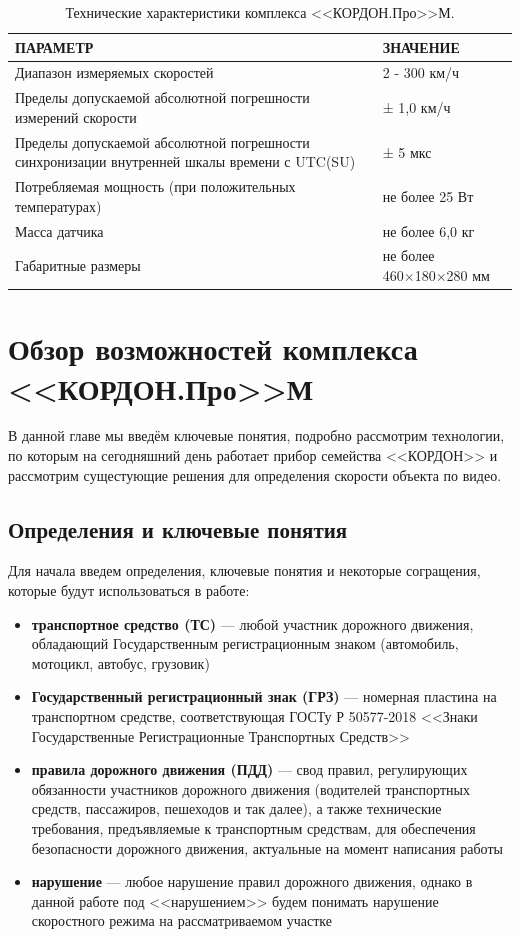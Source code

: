 \documentclass[specification,annotation,times]{itmo-student-thesis}
\begin{document}
\begin{table}[!ht]
	\caption{Технические характеристики комплекса <<КОРДОН.Про>>М.}\label{tb1:cordon-tech}
	\centering
	\begin{tabular}{|p{}|p{}|}\hline
		\textbf{ПАРАМЕТР} &	\textbf{ЗНАЧЕНИЕ} \\\hline\hline
		Диапазон измеряемых скоростей	& 2 - 300 км/ч\\\hline
		Пределы допускаемой абсолютной погрешности измерений скорости &	± 1,0 км/ч\\\hline
		Пределы допускаемой абсолютной погрешности синхронизации 
		внутренней шкалы времени с UTC(SU)	&  ± 5 мкс\\\hline
		Потребляемая мощность (при положительных температурах) &	не более 25 Вт\\\hline
		Масса датчика & не более 6,0 кг\\\hline
		Габаритные размеры	& не более 460×180×280 мм\\\hline
	\end{tabular}
\end{table}



\chapter{Обзор возможностей комплекса <<КОРДОН.Про>>М}\label{chp1}
В данной главе мы введём ключевые понятия, подробно рассмотрим технологии, по которым на сегодняшний день работает прибор семейства <<КОРДОН>> и рассмотрим сущестующие решения для определения скорости объекта по видео.


\section{Определения и ключевые понятия}
Для начала введем определения, ключевые понятия и некоторые согращения, которые будут использоваться в работе:
\begin{itemize}
	\item \textbf{транспортное средство (ТС)} --- любой участник дорожного движения, обладающий Государственным регистрационным знаком (автомобиль, мотоцикл, автобус, грузовик)
	\item \textbf{Государственный регистрационный знак (ГРЗ)} --- номерная пластина на транспортном средстве, соответствующая ГОСТу Р 50577-2018 <<Знаки Государственные Регистрационные Транспортных Средств>>
	\item \textbf{правила дорожного движения (ПДД)} --- свод правил, регулирующих обязанности участников дорожного движения (водителей транспортных средств, пассажиров, пешеходов и так далее), а также технические требования, предъявляемые к транспортным средствам, для обеспечения безопасности дорожного движения, актуальные на момент написания работы
	\item \textbf{нарушение} --- любое нарушение правил дорожного движения, однако в данной работе под <<нарушением>> будем понимать нарушение скоростного режима на рассматриваемом участке
\end{itemize}
\end{document}
